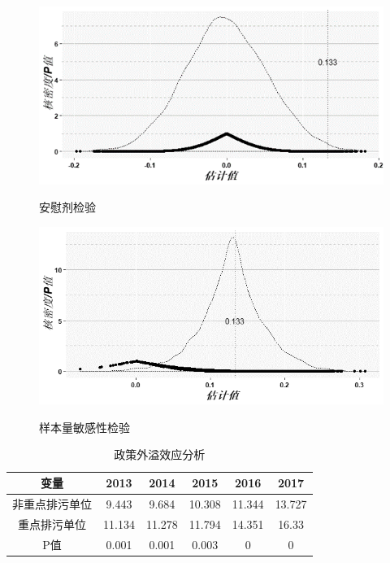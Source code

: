 \documentclass{beamer}	%
\theoremstyle{plain}
\theoremstyle{definition}
\theoremstyle{remark}
\numberwithin{equation}{section}
\begin{document}
\begin{frame}
	\begin{figure}
		\centering
		\includegraphics[scale=1]{img/t2.png}
		\label{安慰剂检验}
		\caption{安慰剂检验}
	\end{figure}
\end{frame}

\begin{frame}
	\begin{figure}
		\centering
		\includegraphics[scale=.6]{img/t3.png}
		\label{样本量敏感性检验}
		\caption{样本量敏感性检验}		
	\end{figure}
\end{frame}




\begin{frame}
	\begin{table}[htbp]
		\small
		\centering
		\caption{政策外溢效应分析}
		\begin{tabular}{cccccc}
			\toprule
			变量    & 2013  & 2014  & 2015  & 2016  & 2017 \\
			\midrule
			非重点排污单位 & 9.443 & 9.684 & 10.308 & 11.344 & 13.727 \\
			重点排污单位 & 11.134 & 11.278 & 11.794 & 14.351 & 16.33 \\
			P值    & 0.001 & 0.001 & 0.003 & 0     & 0 \\
			\bottomrule
		\end{tabular}%
		\label{政策外溢效应分析}%
	\end{table}%
	
\end{frame}
\end{document}
